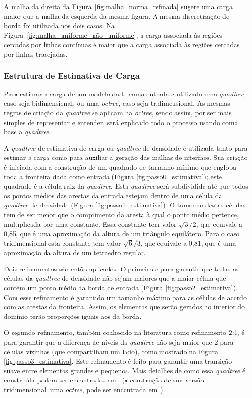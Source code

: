 A malha da direita da Figura~\ref{fig:malha_norma_refinada} sugere uma carga maior que a malha da esquerda da mesma figura. A mesma discretização de borda foi utilizada nos dois casos. Na Figura~\ref{fig:malha_uniforme_não_uniforme}, a carga associada às regiões cercadas por linhas contínuas é maior que a carga associada às regiões cercadas por linhas tracejadas.

\subsubsection{Estrutura de Estimativa de Carga}

Para estimar a carga de um modelo dado como entrada é utilizado uma \textit{quadtree}, caso seja bidimensional, ou uma \textit{octree}, caso seja tridimensional. As mesmas regras de criação da \textit{quadtree} se aplicam na \textit{octree}, sendo assim, por ser mais simples de representar e entender, será explicado todo o processo usando como base a \textit{quadtree}.

A \textit{quadtree} de estimativa de carga ou \textit{quadtree} de densidade é utilizada tanto para estimar a carga como para auxiliar a geração das malhas de interface. Sua criação é iniciada com a construção de um quadrado de tamanho mínimo que engloba toda a fronteira dada como entrada (Figura \ref{fig:passo0_estimativa}); este quadrado é a célula-raiz da \textit{quadtree}. Esta \textit{quadtree} será subdividida até que todos os pontos médios das arestas da entrada estejam dentro de uma célula da \textit{quadtree} de densidade (Figura \ref{fig:passo1_estimativa}). O tamanho destas células tem de ser menor que o comprimento da aresta à qual o ponto médio pertence, multiplicada por uma constante. Essa constante tem valor $\sqrt{3}/2$, que equivale a 0,85, que é uma aproximação da altura de um triângulo equilátero. Para o caso tridimensional esta constante tem valor $\sqrt{6}/3$, que equivale a 0,81, que é uma aproximação da altura de um tetraedro regular.

Dois refinamentos são então aplicados. O primeiro é para garantir que todas as células da \textit{quadtree} de densidade não sejam maiores que a maior célula que contém um ponto médio da borda de entrada (Figura \ref{fig:passo2_estimativa}). Com esse refinamento é garantido um tamanho máximo para as células de acordo com as arestas da fronteira. Assim, os elementos que serão gerados no interior do domínio terão proporções iguais aos da borda. 

O segundo refinamento, também conhecido na literatura como refinamento 2:1, é para garantir que a diferença de níveis da \textit{quadtree} não seja maior que 2 para células vizinhas (que compartilham um lado), como mostrado na Figura \ref{fig:passo3_estimativa}. Este refinamento é feito para garantir uma transição suave entre elementos grandes e pequenos. Mais detalhes de como essa \textit{quadtree} é construída podem ser encontrados em~\cite{bib:Miranda99} (a construção de sua versão tridimensional, uma \textit{octree}, pode ser encontrada em~\cite{bib:Cavalcante-Neto01}).


